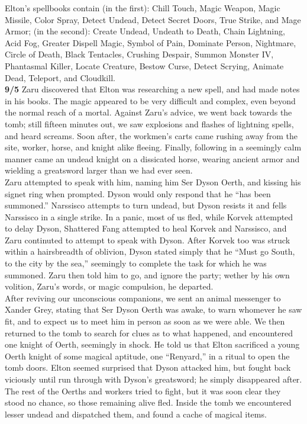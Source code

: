 \documentclass[letterpaper]{article}
\begin{document}
\noindent Elton's spellbooks contain (in the first): Chill Touch, Magic Weapon, Magic Missile, Color Spray, Detect Undead, Detect Secret Doors, True Strike, and Mage Armor;  (in the second): Create Undead, Undeath to Death, Chain Lightning, Acid Fog, Greater Dispell Magic, Symbol of Pain, Dominate Person, Nightmare, Circle of Death, Black Tentacles, Crushing Despair, Summon Monster IV, Phantasmal Killer, Locate Creature, Bestow Curse, Detect Scrying, Animate Dead, Teleport, and Cloudkill.\\

\noindent \textbf{9/5} Zaru discovered that Elton was researching a new spell, and had made notes in his books.  The magic appeared to be very difficult and complex, even beyond the normal reach of a mortal.  Against Zaru's advice, we went back towards the tomb; still fifteen minutes out, we saw explosions and flashes of lightning spells, and heard screams.  Soon after, the workmen's carts came rushing away from the site, worker, horse, and knight alike fleeing.  Finally, following in a seemingly calm manner came an undead knight on a dissicated horse, wearing ancient armor and wielding a greatsword larger than we had ever seen.\\

\noindent Zaru attempted to speak with him, naming him Ser Dyson Oerth, and kissing his signet ring when prompted.  Dyson would only respond that he ``has been summoned.'' Narssisco attempts to turn undead, but Dyson resists it and fells Narssisco in a single strike.  In a panic, most of us fled, while Korvek attempted to delay Dyson, Shattered Fang attempted to heal Korvek and Narssisco, and Zaru continuted to attempt to speak with Dyson.  After Korvek too was struck within a hairsbreadth of oblivion, Dyson stated simply that he ``Must go South, to the city by the sea,'' seemingly to complete the task for which he was summoned.  Zaru then told him to go, and ignore the party; wether by his own volition, Zaru's words, or magic compulsion, he departed.\\

\noindent After reviving our unconscious companions, we sent an animal messenger to Xander Grey, stating that Ser Dyson Oerth was awake, to warn whomever he saw fit, and to expect us to meet him in person as soon as we were able.  We then returned to the tomb to search for clues as to what happened, and encountered one knight of Oerth, seemingly in shock.  He told us that Elton sacrificed a young Oerth knight of some magical aptitude, one ``Renyard,'' in a ritual to open the tomb doors.  Elton seemed surprised that Dyson attacked him, but fought back viciously until run through with Dyson's greatsword; he simply disappeared after.  The rest of the Oerths and workers tried to fight, but it was soon clear they stood no chance, so those remaining alive fled.  Inside the tomb we encountered lesser undead and dispatched them, and found a cache of magical items. \\
\end{document}
